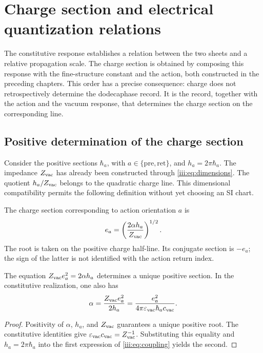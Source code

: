 \section{Charge section and electrical quantization relations}
\label{iii:sec:carga}

The constitutive response establishes a relation between the two sheets and a
relative propagation scale. The charge section is obtained by composing
this response with the fine-structure constant and the action, both
constructed in the preceding chapters. This order has a precise
consequence: charge does not retrospectively determine the dodecaphase record.
It is the record, together with the action and the vacuum response, that
determines the charge section on the corresponding line.

\subsection{Positive determination of the charge section}

Consider the positive sections $\hbar_a$, with
$a\in\{\mathrm{pre},\mathrm{ret}\}$, and $h_a=2\pi\hbar_a$.
The impedance $Z_{\rm vac}$ has already been constructed through
\eqref{iii:eq:dimensions}. The quotient $h_a/Z_{\rm vac}$ belongs to
the quadratic charge line. This dimensional compatibility permits
the following definition without yet choosing an SI chart.

\begin{definition}
The charge section corresponding to action orientation $a$ is
\begin{equation}
 e_a=\left(\frac{2\alpha h_a}{Z_{\rm vac}}\right)^{1/2}.
 \label{iii:eq:charge}
\end{equation}
The root is taken on the positive charge half-line. Its conjugate section
is $-e_a$; the sign of the latter is not identified with the action
return index.
\end{definition}

\begin{proposition}
The equation $Z_{\rm vac}e_a^2=2\alpha h_a$ determines a unique
positive section. In the constitutive realization, one also has
\begin{equation}
 \alpha=\frac{Z_{\rm vac}e_a^2}{2h_a}
 =\frac{e_a^2}{4\pi\varepsilon_{\rm vac}\hbar_a c_{\rm vac}}.
 \label{iii:eq:coupling}
\end{equation}
\end{proposition}
\begin{proof}
Positivity of $\alpha$, $h_a$, and $Z_{\rm vac}$ guarantees a unique
positive root. The constitutive identities give
$\varepsilon_{\rm vac}c_{\rm vac}=Z_{\rm vac}^{-1}$.
Substituting this equality and $h_a=2\pi\hbar_a$ into the first expression
of \eqref{iii:eq:coupling} yields the second.
\end{proof}


